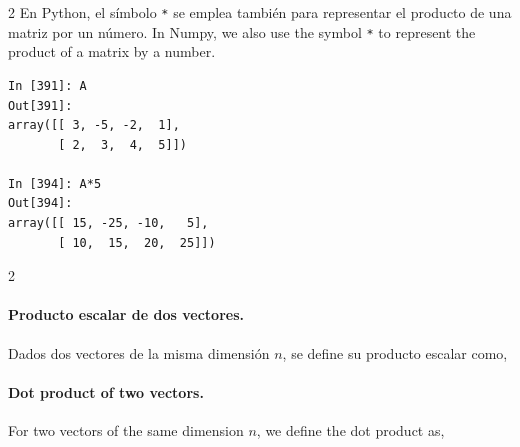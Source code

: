 \begin{paracol}{2}
En Python, el símbolo \texttt{*} se emplea también para representar el producto de una matriz por un número.
\switchcolumn
In Numpy, we also use the symbol \texttt{*} to represent the product of a matrix by a number.
\end{paracol}

\begin{center}
    \begin{minipage}{0.5\textwidth}
        \begin{verbatim}
In [391]: A
Out[391]: 
array([[ 3, -5, -2,  1],
       [ 2,  3,  4,  5]])

In [394]: A*5
Out[394]: 
array([[ 15, -25, -10,   5],
       [ 10,  15,  20,  25]])
        \end{verbatim}
    \end{minipage}
\end{center}

\begin{paracol}{2}
\paragraph{Producto escalar de dos vectores.} Dados dos vectores de la misma dimensión $n$, se define su producto escalar como,
\switchcolumn
\paragraph{Dot product of two vectors.}
For two vectors of the same dimension $n$, we define the dot product as,    
\end{paracol}


